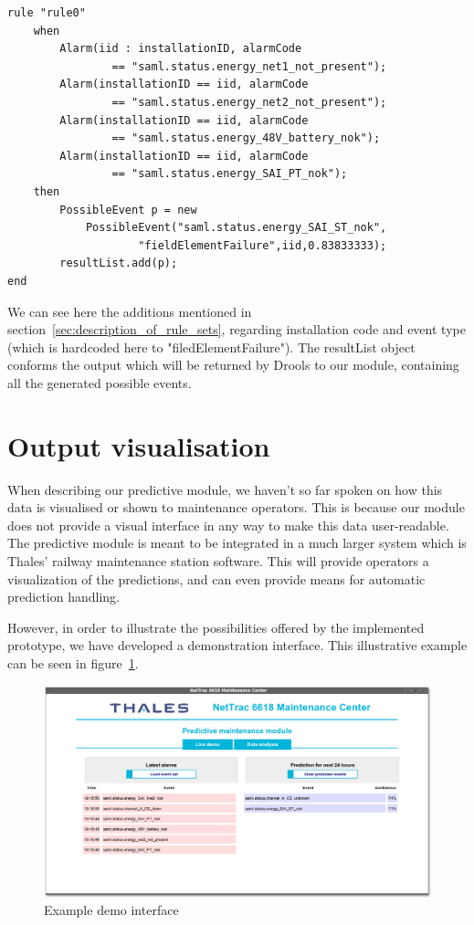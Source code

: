 \begin{verbatim}
rule "rule0"
    when 
        Alarm(iid : installationID, alarmCode 
        		== "saml.status.energy_net1_not_present");
        Alarm(installationID == iid, alarmCode 
        		== "saml.status.energy_net2_not_present");
        Alarm(installationID == iid, alarmCode 
        		== "saml.status.energy_48V_battery_nok");
        Alarm(installationID == iid, alarmCode 
        		== "saml.status.energy_SAI_PT_nok");
    then 
        PossibleEvent p = new 
        	PossibleEvent("saml.status.energy_SAI_ST_nok",
        			"fieldElementFailure",iid,0.83833333);
        resultList.add(p);
end
\end{verbatim}

We can see here the additions mentioned in section~\ref{sec:description_of_rule_sets}, regarding installation code and event type (which is hardcoded here to "filedElementFailure"). The resultList object conforms the output which will be returned by Drools to our module, containing all the generated possible events.

\section{Output visualisation}
When describing our predictive module, we haven't so far spoken on how this data is visualised or shown to maintenance operators. This is because our module does not provide a visual interface in any way to make this data user-readable. The predictive module is meant to be integrated in a much larger system which is Thales' railway maintenance station software. This will provide operators a visualization of the predictions, and can even provide means for automatic prediction handling.

However, in order to illustrate the possibilities offered by the implemented prototype, we have developed a demonstration interface. This illustrative example can be seen in figure~\ref{fig:demoExample}.

\begin{figure}[hbtp]
\includegraphics[width=\textwidth]{img/demoExample.png}
\caption{Example demo interface} \label{fig:demoExample}
\end{figure}

